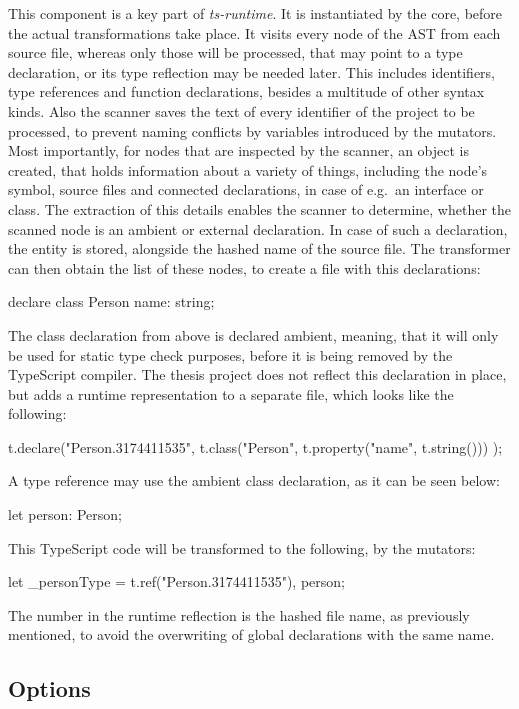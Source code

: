 This component is a key part of \emph{ts-runtime}. It is instantiated by the core, before the actual transformations take place. It visits every node of the AST from each source file, whereas only those will be processed, that may point to a type declaration, or its type reflection may be needed later. This includes identifiers, type references and function declarations, besides a multitude of other syntax kinds. Also the scanner saves the text of every identifier of the project to be processed, to prevent naming conflicts by variables introduced by the mutators. Most importantly, for nodes that are inspected by the scanner, an object is created, that holds information about a variety of things, including the node's symbol, source files and connected declarations, in case of e.g.\ an interface or class. The extraction of this details enables the scanner to determine, whether the scanned node is an ambient or external declaration. In case of such a declaration, the entity is stored, alongside the hashed name of the source file. The transformer can then obtain the list of these nodes, to create a file with this declarations:
\begin{JsCode}[numbers=none]
declare class Person {
  name: string;
}
\end{JsCode}
The class declaration from above is declared ambient, meaning, that it will only be used for static type check purposes, before it is being removed by the TypeScript compiler. The thesis project does not reflect this declaration in place, but adds a runtime representation to a separate file, which looks like the following:
\begin{JsCode}[numbers=none]
t.declare("Person.3174411535",
  t.class("Person", t.property("name", t.string()))
);
\end{JsCode}
A type reference may use the ambient class declaration, as it can be seen below:
\begin{JsCode}[numbers=none]
let person: Person;
\end{JsCode}
This TypeScript code will be transformed to the following, by the mutators:
\begin{JsCode}[numbers=none]
let _personType = t.ref("Person.3174411535"), person;
\end{JsCode}
The number in the runtime reflection is the hashed file name, as previously mentioned, to avoid the overwriting of global declarations with the same name.

\subsection{Options}


